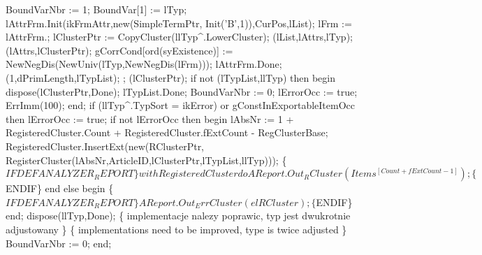    BoundVarNbr := 1;
   BoundVar[1] := lTyp;
   lAttrFrm.Init(ikFrmAttr,new(SimpleTermPtr, Init('B',1)),CurPos,lList);
   lFrm := lAttrFrm.;
   lClusterPtr := CopyCluster(llTyp^.LowerCluster);
   (lList,lAttrs,lTyp);
   (lAttrs,lClusterPtr);
   gCorrCond[ord(syExistence)] := NewNegDis(NewUniv(lTyp,NewNegDis(lFrm)));
   lAttrFrm.Done;
   (1,dPrimLength,lTypList);
   ;
   (lClusterPtr);
   if not (lTypList,llTyp) then
   begin
      dispose(lClusterPtr,Done);
      lTypList.Done;
      BoundVarNbr := 0;
      lErrorOcc := true;
      ErrImm(100);
   end;
   if (llTyp^.TypSort = ikError) or gConstInExportableItemOcc then lErrorOcc := true;
   if not lErrorOcc then
   begin
      lAbsNr :=  1 + RegisteredCluster.Count +  RegisteredCluster.fExtCount - RegClusterBase;
      RegisteredCluster.InsertExt(new(RClusterPtr,
                                      RegisterCluster(lAbsNr,ArticleID,lClusterPtr,lTypList,llTyp)));
      \{$IFDEF ANALYZER_REPORT\}
      with RegisteredCluster do
         AReport.Out_RCluster(Items^[Count+fExtCount-1]);
      \{$ENDIF\}
   end
   else
   begin
      \{$IFDEF ANALYZER_REPORT\}
      AReport.Out_ErrCluster(elRCluster);
      \{$ENDIF\}
   end;
   dispose(llTyp,Done);
   \{ implementacje nalezy poprawic, typ jest dwukrotnie
     adjustowany
   \}
   \{ implementations need to be improved, type is twice
      adjusted
    \}
   BoundVarNbr := 0;
end;
\eatline
{}\nwendcode{}\nwdocspar
